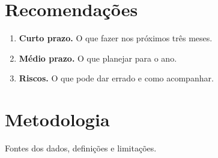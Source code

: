 \documentclass[11pt,a4paper]{report}
\begin{document}
\chapter{Recomendações}
\begin{enumerate}
  \item \textbf{Curto prazo.} O que fazer nos próximos três meses.
  \item \textbf{Médio prazo.} O que planejar para o ano.
  \item \textbf{Riscos.} O que pode dar errado e como acompanhar.
\end{enumerate}

\appendix
\chapter{Metodologia}
Fontes dos dados, definições e limitações.
\end{document}
